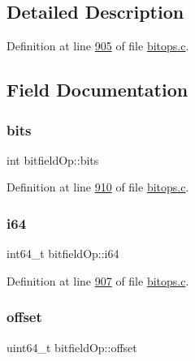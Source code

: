 \subsection{Detailed Description}


Definition at line \hyperlink{bitops_8c_source_l00905}{905} of file \hyperlink{bitops_8c_source}{bitops.\+c}.



\subsection{Field Documentation}
\mbox{\label{structbitfieldOp_a8f086789a4b5e2f2dfa2dc4bfd89d5ed}} 
\subsubsection{\texorpdfstring{bits}{bits}}
{\footnotesize\ttfamily int bitfield\+Op\+::bits}



Definition at line \hyperlink{bitops_8c_source_l00910}{910} of file \hyperlink{bitops_8c_source}{bitops.\+c}.

\mbox{\label{structbitfieldOp_a4cd6c1beed5d37bed833f4302616bee7}} 
\subsubsection{\texorpdfstring{i64}{i64}}
{\footnotesize\ttfamily int64\+\_\+t bitfield\+Op\+::i64}



Definition at line \hyperlink{bitops_8c_source_l00907}{907} of file \hyperlink{bitops_8c_source}{bitops.\+c}.

\mbox{\label{structbitfieldOp_aa0548e52311deb47a5bda61b5844f9e5}} 
\subsubsection{\texorpdfstring{offset}{offset}}
{\footnotesize\ttfamily uint64\+\_\+t bitfield\+Op\+::offset}



